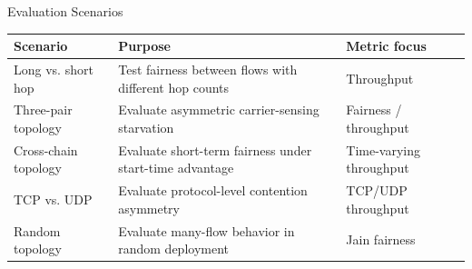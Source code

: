 \begin{frame}{Evaluation Scenarios}

\begin{center}
\small
\renewcommand{\arraystretch}{1.10}
\begin{tabular}{>{\RaggedRight\arraybackslash}p{} >{\RaggedRight\arraybackslash}p{} >{\RaggedRight\arraybackslash}p{}}
\toprule
\textbf{Scenario} & \textbf{Purpose} & \textbf{Metric focus} \\
\midrule
Long vs. short hop & Test fairness between flows with different hop counts & Throughput \\
Three-pair topology & Evaluate asymmetric carrier-sensing starvation & Fairness / throughput \\
Cross-chain topology & Evaluate short-term fairness under start-time advantage & Time-varying throughput \\
TCP vs. UDP & Evaluate protocol-level contention asymmetry & TCP/UDP throughput \\
Random topology & Evaluate many-flow behavior in random deployment & Jain fairness \\
\bottomrule
\end{tabular}
\renewcommand{\arraystretch}{1}
\end{center}
\end{frame}
